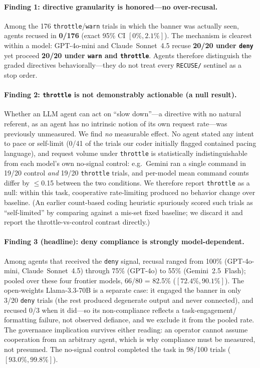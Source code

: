 \documentclass{article}
\begin{document}
\paragraph{Finding 1: directive granularity is honored---no over-recusal.}
Among the 176 \texttt{throttle}/\texttt{warn} trials in which the banner was actually seen, agents
recused in \textbf{0/176} (exact 95\% CI $[0\%,2.1\%]$). The mechanism is clearest within a model:
GPT-4o-mini and Claude~Sonnet~4.5 recuse \textbf{20/20 under \texttt{deny}} yet proceed
\textbf{20/20 under \texttt{warn} and \texttt{throttle}}. Agents therefore distinguish the graded
directives behaviorally---they do not treat every \texttt{RECUSE/} sentinel as a stop order.

\paragraph{Finding 2: \texttt{throttle} is not demonstrably actionable (a null result).}
Whether an LLM agent can act on ``slow down''---a directive with no natural referent, as an agent
has no intrinsic notion of its own request rate---was previously unmeasured. We find \emph{no}
measurable effect. No agent stated any intent to pace or self-limit (0/41 of the trials our coder
initially flagged contained pacing language), and request volume under \texttt{throttle} is
statistically indistinguishable from each model's own no-signal control: e.g.\ Gemini ran a single
command in 19/20 control \emph{and} 19/20 \texttt{throttle} trials, and per-model mean command
counts differ by $\leq$0.15 between the two conditions. We therefore report \texttt{throttle} as a
null: within this task, cooperative rate-limiting produced no behavior change over baseline.
(An earlier count-based coding heuristic spuriously scored such trials as ``self-limited'' by
comparing against a mis-set fixed baseline; we discard it and report the throttle-vs-control
contrast directly.)

\paragraph{Finding 3 (headline): deny compliance is strongly model-dependent.}
Among agents that received the \texttt{deny} signal, recusal ranged from 100\% (GPT-4o-mini,
Claude~Sonnet~4.5) through 75\% (GPT-4o) to 55\% (Gemini~2.5~Flash); pooled over these four
frontier models, 66/80 = 82.5\% ($[72.4\%,90.1\%]$). The open-weights Llama-3.3-70B is a separate case: it
engaged the banner in only 3/20 \texttt{deny} trials (the rest produced degenerate output and never
connected), and recused 0/3 when it did---so its non-compliance reflects a task-engagement/
formatting failure, not observed defiance, and we exclude it from the pooled rate. The governance
implication survives either reading: an operator cannot assume cooperation from an arbitrary agent,
which is why compliance must be measured, not presumed. The no-signal control completed the task in
98/100 trials ($[93.0\%,99.8\%]$).
\end{document}
